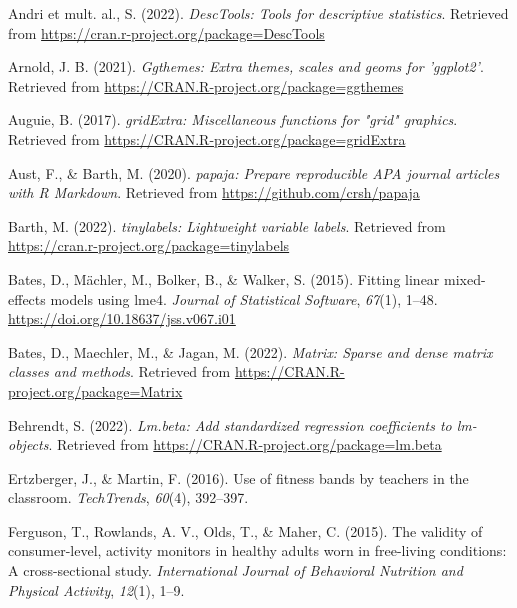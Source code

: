 \documentclass[
  man]{apa6}
\newlength{\cslhangindent}
\newlength{\cslentryspacingunit} %
\newenvironment{CSLReferences}[2] %
 {%
  \setlength{\parindent}{0pt}
  \ifodd #1
  \let\oldpar\par
  \def\par{\hangindent=\cslhangindent\oldpar}
  \fi
  \setlength{\parskip}{#2\cslentryspacingunit}
 }%
 {}
\begin{document}
\hypertarget{refs}{}
\begin{CSLReferences}{1}{0}
\leavevmode{}%
Andri et mult. al., S. (2022). \emph{{DescTools}: Tools for descriptive statistics}. Retrieved from \url{https://cran.r-project.org/package=DescTools}

\leavevmode{}%
Arnold, J. B. (2021). \emph{Ggthemes: Extra themes, scales and geoms for 'ggplot2'}. Retrieved from \url{https://CRAN.R-project.org/package=ggthemes}

\leavevmode{}%
Auguie, B. (2017). \emph{gridExtra: Miscellaneous functions for "grid" graphics}. Retrieved from \url{https://CRAN.R-project.org/package=gridExtra}

\leavevmode{}%
Aust, F., \& Barth, M. (2020). \emph{{papaja}: {Prepare} reproducible {APA} journal articles with {R Markdown}}. Retrieved from \url{https://github.com/crsh/papaja}

\leavevmode{}%
Barth, M. (2022). \emph{{tinylabels}: Lightweight variable labels}. Retrieved from \url{https://cran.r-project.org/package=tinylabels}

\leavevmode{}%
Bates, D., Mächler, M., Bolker, B., \& Walker, S. (2015). Fitting linear mixed-effects models using {lme4}. \emph{Journal of Statistical Software}, \emph{67}(1), 1--48. \url{https://doi.org/10.18637/jss.v067.i01}

\leavevmode{}%
Bates, D., Maechler, M., \& Jagan, M. (2022). \emph{Matrix: Sparse and dense matrix classes and methods}. Retrieved from \url{https://CRAN.R-project.org/package=Matrix}

\leavevmode{}%
Behrendt, S. (2022). \emph{Lm.beta: Add standardized regression coefficients to lm-objects}. Retrieved from \url{https://CRAN.R-project.org/package=lm.beta}

\leavevmode{}%
Ertzberger, J., \& Martin, F. (2016). Use of fitness bands by teachers in the classroom. \emph{TechTrends}, \emph{60}(4), 392--397.

\leavevmode{}%
Ferguson, T., Rowlands, A. V., Olds, T., \& Maher, C. (2015). The validity of consumer-level, activity monitors in healthy adults worn in free-living conditions: A cross-sectional study. \emph{International Journal of Behavioral Nutrition and Physical Activity}, \emph{12}(1), 1--9.


\end{CSLReferences}
\end{document}
